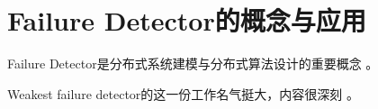 \chapter{Failure Detector的概念与应用}

Failure Detector是分布式系统建模与分布式算法设计的重要概念 \cite{Chandra96unreliable}。

Weakest failure detector的这一份工作名气挺大，内容很深刻 \cite{Chandra96weakest}。

